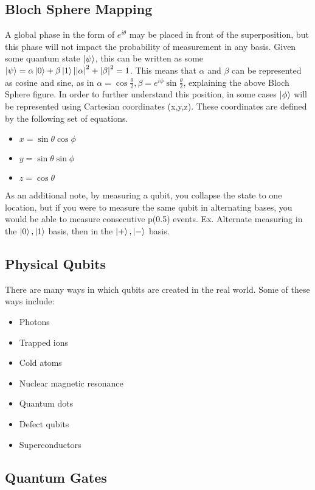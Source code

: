\documentclass{article}
\begin{document}
\subsection{Bloch Sphere Mapping}

A global phase in the form of $e^{i\theta}$ may be placed in front of the superposition, but this phase will not impact the probability of measurement in any basis. Given some quantum state $\ket{\psi}$, this can be written as some $\ket{\psi} = \alpha\ket{0}+\beta\ket{1}| \abs{\alpha}^2+\abs{\beta}^2=1$. This means that $\alpha$ and $\beta$ can be represented as cosine and sine, as in $\alpha = \cos{\frac{\theta}{2}}, \beta = e^{i\phi}\sin{\frac{\theta}{2}}$, explaining the above Bloch Sphere figure. In order to further understand this position, in some cases $\ket{\phi}$ will be represented using Cartesian coordinates (x,y,z). These coordinates are defined by the following set of equations. 
\begin{itemize}
    \item $x = \sin{\theta}\cos{\phi}$
    \item $y = \sin{\theta}\sin{\phi}$
    \item $z = \cos{\theta}$
\end{itemize}
As an additional note, by measuring a qubit, you collapse the state to one location, but if you were to measure the same qubit in alternating bases, you would be able to measure consecutive p(0.5) events. Ex. Alternate measuring in the $\ket{0}, \ket{1}$ basis, then in the $\ket{+}, \ket{-}$ basis. 

\subsection{Physical Qubits}

There are many ways in which qubits are created in the real world. Some of these ways include:
\begin{itemize}
    \item Photons
    \item Trapped ions
    \item Cold atoms
    \item Nuclear magnetic resonance
    \item Quantum dots
    \item Defect qubits
    \item Superconductors
\end{itemize}

\subsection{Quantum Gates}
\end{document}
